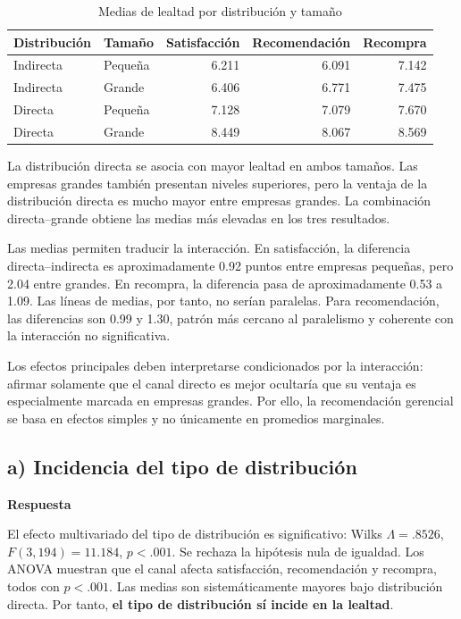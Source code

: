 \documentclass[11pt,letterpaper]{article}
\begin{document}
\begin{table}[H]
\centering
\caption{Medias de lealtad por distribución y tamaño}
\begin{tabular}{llrrr}
\toprule
Distribución & Tamaño & Satisfacción & Recomendación & Recompra\\
\midrule
Indirecta & Pequeña & 6.211 & 6.091 & 7.142\\
Indirecta & Grande & 6.406 & 6.771 & 7.475\\
Directa & Pequeña & 7.128 & 7.079 & 7.670\\
Directa & Grande & 8.449 & 8.067 & 8.569\\
\bottomrule
\end{tabular}
\end{table}

La distribución directa se asocia con mayor lealtad en ambos tamaños. Las empresas grandes también presentan niveles superiores, pero la ventaja de la distribución directa es mucho mayor entre empresas grandes. La combinación directa--grande obtiene las medias más elevadas en los tres resultados.

Las medias permiten traducir la interacción. En satisfacción, la diferencia directa--indirecta es aproximadamente 0.92 puntos entre empresas pequeñas, pero 2.04 entre grandes. En recompra, la diferencia pasa de aproximadamente 0.53 a 1.09. Las líneas de medias, por tanto, no serían paralelas. Para recomendación, las diferencias son 0.99 y 1.30, patrón más cercano al paralelismo y coherente con la interacción no significativa.

Los efectos principales deben interpretarse condicionados por la interacción: afirmar solamente que el canal directo es mejor ocultaría que su ventaja es especialmente marcada en empresas grandes. Por ello, la recomendación gerencial se basa en efectos simples y no únicamente en promedios marginales.

\subsection{a) Incidencia del tipo de distribución}

\textbf{Respuesta}

El efecto multivariado del tipo de distribución es significativo: Wilks $\Lambda=.8526$, $F(3,194)=11.184$, $p<.001$. Se rechaza la hipótesis nula de igualdad. Los ANOVA muestran que el canal afecta satisfacción, recomendación y recompra, todos con $p<.001$. Las medias son sistemáticamente mayores bajo distribución directa. Por tanto, \textbf{el tipo de distribución sí incide en la lealtad}.
\end{document}

